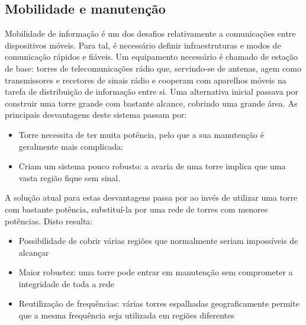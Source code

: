 \documentclass{llncs}
\begin{document}
\subsection{Mobilidade e manutenção}
\hspace*{1.5em}Mobilidade de informação é um dos desafios relativamente a comunicações entre dispositivos móveis. Para tal, é necessário definir infraestruturas e modos de comunicação rápidos e fiáveis. Um equipamento necessário é chamado de estação de base: torres de telecomunicações rádio que, servindo-se de antenas, agem como transmissores e recetores de sinais rádio e cooperam com aparelhos móveis na tarefa de distribuição de informação entre si.
Uma alternativa inicial passava por construir uma torre grande com bastante alcance, cobrindo uma grande área. As principais desvantagens deste sistema passam por:
\begin{itemize}
    \item Torre necessita de ter muita potência, pelo que a sua manutenção é geralmente mais complicada;
    \item Criam um sistema pouco robusto: a avaria de uma torre implica que uma vasta região fique sem sinal.
\end{itemize}

\hspace*{1.5em}A solução atual para estas desvantagens passa por ao invés de utilizar uma torre com bastante potência, substituí-la por uma rede de torres com menores potências. Disto resulta:

\begin{itemize}
    \item Possibilidade de cobrir várias regiões que normalmente seriam impossíveis de alcançar
    \item Maior robustez: uma torre pode entrar em manutenção sem comprometer a integridade de toda a rede
    \item Reutilização de frequências: várias torres espalhadas geograficamente permite que a mesma frequência seja utilizada em regiões diferentes
\end{itemize}
\end{document}
